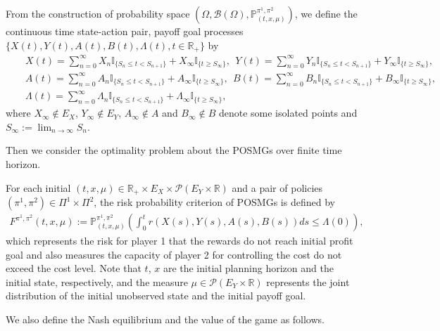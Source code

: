 \documentclass[12pt]{article}
\begin{document}
From the construction of probability space $(\Omega,\mathscr{B}(\Omega),\mathbb{P}^{\pi^1,\pi^2}_{(t,x,\mu)})$, we define  the continuous time state-action pair, payoff goal processes $\{X(t),Y(t),A(t),B(t),\Lambda(t),t\in\mathbb{R}_+\}$ by
\begin{eqnarray*}
	&&X(t)=\sum_{n=0}^{\infty}X_n\mathbb{I}_{\{S_n\leq t<S_{n+1}\}}+X_{\infty}\mathbb{I}_{\{t\ge S_{\infty}\}},~~ Y(t)=\sum_{n=0}^{\infty}Y_n\mathbb{I}_{\{S_n\leq t<S_{n+1}\}}+Y_{\infty}\mathbb{I}_{\{t\ge S_{\infty}\}},\\
	&&A(t)=\sum_{n=0}^{\infty}A_n\mathbb{I}_{\{S_n\leq t<S_{n+1}\}}+A_{\infty}\mathbb{I}_{\{t\ge S_{\infty}\}},~~
	B(t)=\sum_{n=0}^{\infty}B_n\mathbb{I}_{\{S_n\leq t<S_{n+1}\}}+B_{\infty}\mathbb{I}_{\{t\ge S_{\infty}\}},\\
	&&\Lambda(t)=\sum_{n=0}^{\infty}\Lambda_n\mathbb{I}_{\{S_n\leq t<S_{n+1}\}}+\Lambda_{\infty}\mathbb{I}_{\{t\ge S_{\infty}\}},
\end{eqnarray*}
where $X_{\infty}\notin E_X$, $Y_{\infty}\notin E_Y$, $A_{\infty}\notin A$ and $B_{\infty}\notin B$ denote some isolated points and $S_{\infty}:=\lim_{n\to\infty}S_n$.

Then we consider the optimality problem about the POSMGs over finite time horizon.

For each initial $(t,x,\mu)\in \mathbb{R}_+\times E_X\times \mathscr{P}(E_Y\times \mathbb{R})$ and a pair of policies $(\pi^1,\pi^2)\in \Pi^1\times \Pi^2$, the risk probability criterion of POSMGs is defined by
\begin{eqnarray}\label{probability criterion}
	F^{\pi^1,\pi^2}(t,x,\mu):=\mathbb{P}^{\pi^1,\pi^2}_{(t,x,\mu)}(\int_0^t r(X(s),Y(s),A(s),B(s))ds\leq \Lambda(0)),
\end{eqnarray}
which represents the risk for player 1 that the rewards do not reach initial profit goal and also measures the capacity of player 2 for controlling the cost do not exceed the cost level.
Note that $t$, $x$ are the initial planning horizon and the initial state, respectively, and the measure $\mu\in \mathscr{P}(E_Y\times \mathbb{R})$ represents the joint distribution of the initial unobserved state and the initial payoff goal.


We also define the Nash equilibrium and the value of the game as follows.
\end{document}
